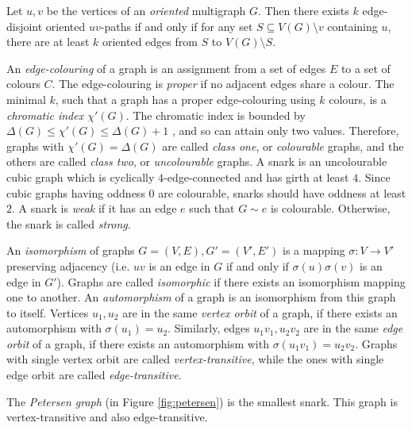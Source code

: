 \begin{theorem} \emph{\cite[p. 149]{oriented_menger}}
Let $u, v$ be the vertices of an \emph{oriented} multigraph $G$. Then there exists $k$ edge-disjoint oriented $uv$-paths if and only if for any set $S\subseteq V(G)\setminus{v}$ containing $u$, there are at least $k$ oriented edges from $S$ to $V(G)\setminus S$. \label{th:oriented_menger}
\end{theorem}

An \emph{edge-colouring} of a graph is an assignment from a set of edges $E$ to a set of colours $C$. The edge-colouring is \emph{proper} if no adjacent edges share a colour. The minimal $k$, such that a graph has a proper edge-colouring using $k$ colours, is a \emph{chromatic index $\chi'(G)$}. The chromatic index is bounded by $\Delta(G)\leq\chi'(G)\leq\Delta(G)+1$ \cite{vizing}, and so can attain only two values. Therefore, graphs with $\chi'(G)=\Delta(G)$ are called \emph{class one}, or \emph{colourable} graphs, and the others are called \emph{class two}, or \emph{uncolourable} graphs. A snark is an uncolourable cubic graph which is cyclically $4$-edge-connected and has girth at least $4$. Since cubic graphs having oddness $0$ are colourable, snarks should have oddness at least $2$. A snark is \emph{weak} if it has an edge $e$ such that $G\sim e$ is colourable. Otherwise, the snark is called \emph{strong}.

An \emph{isomorphism} of graphs $G=(V,E), G'=(V',E')$ is a mapping $\sigma\colon V\to V'$ preserving adjacency (i.e. $uv$ is an edge in $G$ if and only if $\sigma(u)\sigma(v)$ is an edge in $G'$). Graphs are called \emph{isomorphic} if there exists an isomorphism mapping one to another. An \emph{automorphism} of a graph is an isomorphism from this graph to itself. Vertices $u_1, u_2$ are in the same \emph{vertex orbit} of a graph, if there exists an automorphism with $\sigma(u_1)=u_2$. Similarly, edges $u_1v_1, u_2v_2$ are in the same \emph{edge orbit} of a graph, if there exists an automorphism with $\sigma(u_1v_1)=u_2v_2$. Graphs with single vertex orbit are called \emph{vertex-transitive}, while the ones with single edge orbit are called \emph{edge-transitive}.

The \emph{Petersen graph} (in Figure \ref{fig:petersen}) is the smallest snark. This graph is vertex-transitive and also edge-transitive.

